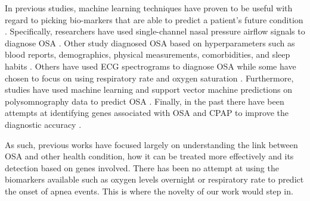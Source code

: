 \documentclass[acmsmall]{acmart}
\begin{document}
 In previous studies, machine learning techniques have proven to be useful with regard to picking bio-markers that are able to predict a patient's future condition \cite{zhang2021machine}. Specifically, researchers have used single-channel nasal pressure airflow signals to diagnose OSA \cite{haidar2017sleep}. Other study diagnosed OSA based on hyperparameters such as blood reports, demographics, physical measurements, comorbidities, and sleep habits \cite{ramesh2021towards}. Others have used ECG spectrograms to diagnose OSA \cite{lin2021sleep,erdenebayar2019deep,tison2019automated} while some have chosen to focus on using respiratory rate and oxygen saturation \cite{ravelo2015oxygen}. Furthermore, studies have used machine learning and support vector machine predictions on polysomnography data to predict OSA \cite{palotti2019benchmark,huang2020support}. Finally, in the past there have been attempts at identifying genes associated with OSA and CPAP to improve the diagnostic accuracy \cite{bernardini2022osasud}. 
 
 As such, previous works have focused largely on understanding the link between OSA and other health condition, how it can be treated more effectively and its detection based on genes involved. There has been no attempt at using the biomarkers available such as oxygen levels overnight or respiratory rate to predict the onset of apnea events. This is where the novelty of our work would step in. 





\end{document}
